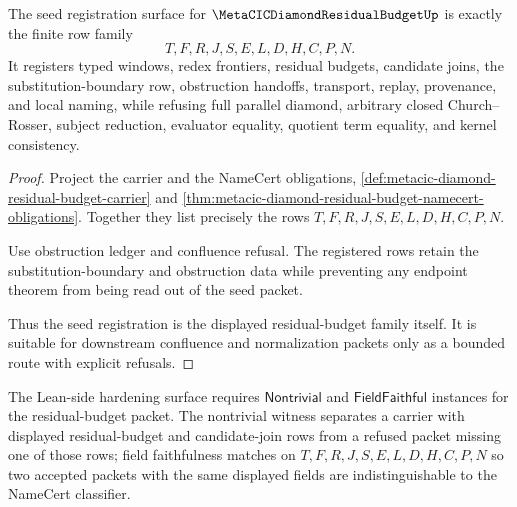 \begin{theorem}
\label{thm:metacic-diamond-residual-budget-seed-registration}
The seed registration surface for $\MetaCICDiamondResidualBudgetUp$ is exactly the finite row family
$$
T,F,R,J,S,E,L,D,H,C,P,N .
$$
It registers typed windows, redex frontiers, residual budgets, candidate joins, the substitution-boundary row, obstruction handoffs, transport, replay, provenance, and local naming, while refusing full parallel diamond, arbitrary closed Church--Rosser, subject reduction, evaluator equality, quotient term equality, and kernel consistency.
\end{theorem}
\begin{proof}
Project the carrier and the NameCert obligations, \autoref{def:metacic-diamond-residual-budget-carrier} and \autoref{thm:metacic-diamond-residual-budget-namecert-obligations}. Together they list precisely the rows $T,F,R,J,S,E,L,D,H,C,P,N$.

Use obstruction ledger and confluence refusal. The registered rows retain the substitution-boundary and obstruction data while preventing any endpoint theorem from being read out of the seed packet.

Thus the seed registration is the displayed residual-budget family itself. It is suitable for downstream confluence and normalization packets only as a bounded route with explicit refusals.
\end{proof}



The Lean-side hardening surface requires $\mathsf{Nontrivial}$ and $\mathsf{FieldFaithful}$ instances for the residual-budget packet. The nontrivial witness separates a carrier with displayed residual-budget and candidate-join rows from a refused packet missing one of those rows; field faithfulness matches on $T,F,R,J,S,E,L,D,H,C,P,N$ so two accepted packets with the same displayed fields are indistinguishable to the NameCert classifier.

